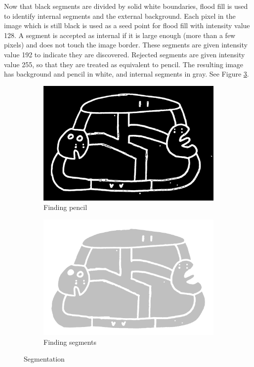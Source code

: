 \documentclass[11pt]{IEEEtran}
\begin{document}
Now that black segments are divided by solid white boundaries, flood fill is used to identify internal segments and the external background. Each pixel in the image which is still black is used as a seed point for flood fill with intensity value 128. A segment is accepted as internal if it is large enough (more than a few pixels) and does not touch the image border. These segments are given intensity value 192 to indicate they are discovered. Rejected segments are given intensity value 255, so that they are treated as equivalent to pencil. The resulting image has background and pencil in white, and internal segments in gray. See Figure \ref{fig:seg}.

\begin{figure}[h]
     \centering
     \begin{subfigure}[b]{0.24\textwidth}
         \centering
         \includegraphics[width=\textwidth]{s1}
         \caption{Finding pencil}
         \label{fig:s1}
     \end{subfigure}
     \hfill
     \begin{subfigure}[b]{0.24\textwidth}
         \centering
         \includegraphics[width=\textwidth]{s2}
         \caption{Finding segments}
         \label{fig:s2}
     \end{subfigure}
        \caption{Segmentation}
        \label{fig:seg}
\end{figure}
\end{document}
